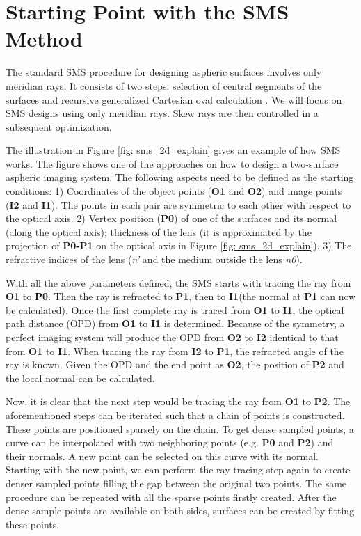 \section{Starting Point with the SMS Method}
The standard SMS procedure for designing aspheric surfaces involves only meridian rays. It consists of two steps: selection of central segments of the surfaces and recursive generalized Cartesian oval calculation \cite{LinWang2011}\cite{MinanoOE09}. We will focus on SMS designs using only meridian rays. Skew rays are then controlled in a subsequent optimization. 

The illustration in Figure \ref{fig: sms_2d_explain} gives an example of how SMS works. The figure shows one of the approaches on how to design a two-surface aspheric imaging system. The following aspects need to be defined as the starting conditions: 1) Coordinates of the object points (\textbf{O1} and \textbf{O2}) and image points (\textbf{I2} and \textbf{I1}). The points in each pair are symmetric to each other with respect to the optical axis. 2) Vertex position (\textbf{P0}) of one of the surfaces and its normal (along the optical axis); thickness of the lens (it is approximated by the projection of \textbf{P0-P1} on the optical axis in Figure \ref{fig: sms_2d_explain}). 3) The refractive indices of the lens (\textit{n'} and the medium outside the lens \textit{n0}). 

With all the above parameters defined, the SMS starts with tracing the ray from \textbf{O1} to \textbf{P0}. Then the ray is refracted to \textbf{P1}, then to \textbf{I1}(the normal at \textbf{P1} can now be calculated). Once the first complete ray is traced from \textbf{O1} to \textbf{I1}, the optical path distance (OPD) from \textbf{O1} to \textbf{I1} is determined. Because of the symmetry, a perfect imaging system will produce the OPD from \textbf{O2} to \textbf{I2} identical to that from \textbf{O1} to \textbf{I1}. When tracing the ray from \textbf{I2} to \textbf{P1}, the refracted angle of the ray is known. Given the OPD and the end point as \textbf{O2}, the position of \textbf{P2} and the local normal can be calculated. 

Now, it is clear that the next step would be tracing the ray from \textbf{O1} to \textbf{P2}. The aforementioned steps can be iterated such that a chain of points is constructed. These points are positioned sparsely on the chain. To get dense sampled points, a curve can be interpolated with two neighboring points (e.g.  \textbf{P0} and \textbf{P2}) and their normals. A new point can be selected on this curve with its normal. Starting with the new point, we can perform the ray-tracing step again to create denser sampled points filling the gap between the original two points. The same procedure can be repeated with all the sparse points firstly created. After the dense sample points are available on both sides, surfaces can be created by fitting these points. 

